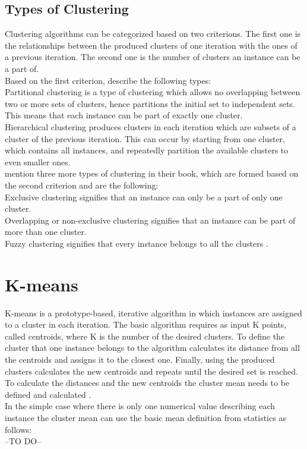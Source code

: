 \subsection{Types of Clustering}
Clustering algorithms can be categorized based on two criterions. The first one is the relationships between the produced clusters of one iteration with the ones of a previous iteration. The second one is the number of clusters an instance can be a part of. \\
Based on the first criterion, \textcite{tanSteinKum} describe the following types: \\
Partitional clustering is a type of clustering which allows no overlapping between two or more sets of clusters, hence partitions the initial set to independent sets. This means that each instance can be part of exactly one cluster. \\
Hierarchical clustering produces clusters in each iteration which are subsets of a cluster of the previous iteration. This can occur by starting from one cluster, which contains all instances, and repeatedly partition the available clusters to even smaller ones. \\
\textcite{tanSteinKum} mention three more types of clustering in their book, which are formed based on the second criterion and are the following: \\
Exclusive clustering signifies that an instance can only be a part of only one cluster. \\
Overlapping or non-exclusive clustering signifies that an instance can be part of more than one cluster. \\
Fuzzy clustering signifies that every instance belongs to all the clusters \autocite{tanSteinKum}.

\section{K-means}
K-means is a prototype-based, iterative algorithm in which instances are assigned to a cluster in each iteration. The basic algorithm requires as input K points, called centroids, where K is the number of the desired clusters. To define the cluster that one instance belongs to the algorithm calculates its distance from all the centroids and assigns it to the closest one. Finally, using the produced clusters calculates the new centroids and repeats until the desired set is reached. To calculate the distances and the new centroids the cluster mean needs to be defined and calculated \autocite{dunham, tanSteinKum}. \\
In the simple case where there is only one numerical value describing each instance the cluster mean can use the basic mean definition from statistics as follows: \\
--TO DO--

